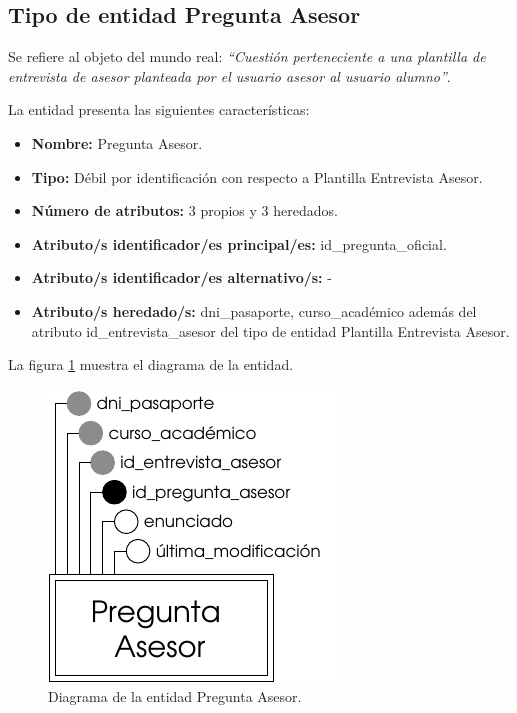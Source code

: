 \subsection{Tipo de entidad Pregunta Asesor}

   \begin{description}

   \item[Definición] Se refiere al objeto del mundo real: \emph{``Cuestión
   perteneciente a una plantilla de entrevista de asesor planteada por el
   usuario asesor al usuario alumno''}.

   \item[Características] La entidad presenta las siguientes características:
      \begin{itemize}
         \item \textbf{Nombre:} Pregunta Asesor.
         \item \textbf{Tipo:} Débil por identificación con respecto a
         Plantilla Entrevista Asesor.
         \item \textbf{Número de atributos:} 3 propios y 3 heredados.
         \item \textbf{Atributo/s identificador/es principal/es:} id\_pregunta\_oficial.
         \item \textbf{Atributo/s identificador/es alternativo/s:} -
         \item \textbf{Atributo/s heredado/s:} dni\_pasaporte, curso\_académico
         además del atributo id\_entrevista\_asesor del tipo de entidad
         Plantilla Entrevista Asesor.
      \end{itemize}

   \item[Diagrama] La figura \ref{diagramaPregAse} muestra el diagrama de la entidad.
   \item \begin{figure}[!ht]
            \begin{center}
            \includegraphics[]{07.Modelo_Entidad-Interrelacion/7.2.Analisis_Entidades/diagramas/preg_ase.pdf}
            \caption{Diagrama de la entidad Pregunta Asesor.}
            \label{diagramaPregAse}
            \end{center}
         \end{figure}


\end{description}
